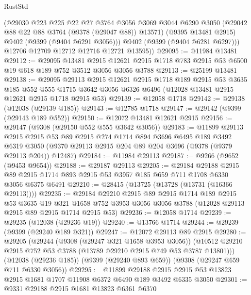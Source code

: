 \begin{lexlean}{RustStd}
\begin{coremodule}
          (@29030
            @223
            @225
            @22
            @27
            @3764
            @3056
            @3069
            @3044
            @6290
            @3050
            (@29042 @88 @22 @88 @3764 (@9378 (@29047 @88)) @13571)
            (@9395 @13481 @2915)
            @9402
            (@9399 (@9404 @6291 @3056)))
          @9402
          (@9399 (@9404 @6281 @6297)))
        @12706
        @12709
        @12712
        @12716
        @12721
        @13595))
@29095 := @11984 @13481
@29112 := @29095
    @13481
    @2915
    @12621
    @2915
    @1718
    @783
    @2915
    @53
    @6500
    @19
    @618
    @189
    @752
    @3512
    @3056
    @3056
    @3788
@29113 := @25199 @13481
@29138 := @29095
    @29113
    @2915
    @12621
    @2915
    @1718
    @189
    @2915
    @53
    @3635
    @185
    @552
    @555
    @1715
    @3642
    @3056
    @6326
    @6496
    (@12028 @13481 @2915 @12621 @2915 @1718 @2915 @53)
@29139 := @12058 @1718
@29142 := @29138 (@12038 (@29139 @185))
@29143 := @12785 @1718
@29147 := @29142 (@9399 (@29143 @189 @552))
@29150 := @12072 @13481 @12621 @2915
@29156 := @29147 (@9308 (@29150 @552 @555 @3642 @3056))
@29183 := @11899
    @29113
    @2915
    @2915
    @53
    @89
    @2915
    @274
    @1714
    @894
    @3696
    @6495
    @189
    @3492
    @6319
    @3050
    (@9370 @29113 @2915 @204 @89 @204 @3696 (@9378 (@9379 @29113 @204)) @12487)
@29184 := @11984 @29113
@29187 := @9266 (@9652 (@9453 @9654))
@29188 := @29187 @29113
@29205 := @29184
    @29188
    @2915
    @89
    @2915
    @1714
    @893
    @2915
    @53
    @3957
    @185
    @659
    @711
    @1708
    @6330
    @3056
    @6375
    @6491
@29210 := @28415 (@13725 (@13728 (@13731 (@16366 @29113))))
@29235 := @29184
    @29210
    @2915
    @89
    @2915
    @1714
    @189
    @2915
    @53
    @3635
    @19
    @321
    @1658
    @752
    @3953
    @3056
    @3056
    @3788
    (@12028 @29113 @2915 @89 @2915 @1714 @2915 @53)
@29236 := @12058 @1714
@29239 := @29235 (@12038 (@29236 @19))
@29240 := @13766 @1714
@29244 := @29239 (@9399 (@29240 @189 @321))
@29247 := @12072 @29113 @89 @2915
@29280 := @29205
    (@29244
      (@9308 (@29247 @321 @1658 @3953 @3056))
      (@10512 @29210 @2915 @752 @53 @3788 (@13789 @29210 @2915 @749 @53 @3787 @13801)))
    (@12038 (@29236 @185))
    (@9399 (@29240 @893 @659))
    (@9308 (@29247 @659 @711 @6330 @3056))
@29295 := @11899
    @29188
    @2915
    @2915
    @53
    @13823
    @2915
    @1681
    @1707
    @11908
    @6372
    @6490
    @189
    @3492
    @6335
    @3050
@29301 := @9331 @29188 @2915 @1681 @13823 @6361 @6370

\end{coremodule}
\end{lexlean}
